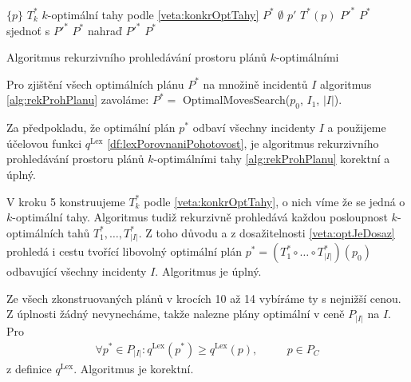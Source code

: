\begin{algorithm}[h]
  \begin{algorithmic}[1]
      \State \Return $\{ p \}$
    \EndIf
    \State $T^*_k$ \gets $k$-optimální tahy podle \ref{veta:konkrOptTahy}
    \State $P^*$ \gets $\emptyset$
      \State $p'$ \gets $T^*(p)$
      \State $P'^*$ \gets {}
        \State $P^*$ sjednoť s $P'^*$
        \State $P^*$ nahraď $P'^*$
      \EndIf
    \EndFor
    \State \Return $P^*$
  \EndFunction
  \end{algorithmic}
  \caption{Algoritmus rekurzivního prohledávání prostoru plánů $k$-optimálními}
  \label{alg:rekProhPlanu}
\end{algorithm}

Pro zjištění všech optimálních plánu $P^*$ na množině incidentů $I$ algoritmus \ref{alg:rekProhPlanu} zavoláme: $P^* = $ OptimalMovesSearch($p_0$, $I_1$, $|I|$).

\begin{veta}\label{veta:algoritmusPredpoklady}
  Za předpokladu, že optimální plán $p^*$ odbaví všechny incidenty $I$ a použijeme účelovou funkci $q^{\text{Lex}}$ \ref{df:lexPorovnaniPohotovost},
  je algoritmus rekurzivního prohledávání prostoru plánů $k$-optimálními tahy \ref{alg:rekProhPlanu} korektní a úplný.
\end{veta}
\begin{dukaz}
  V kroku 5 konstruujeme $T^*_k$ podle \ref{veta:konkrOptTahy}, o nich víme že se jedná o $k$-optimální tahy.
  Algoritmus tudiž rekurzivně prohledává každou posloupnost $k$-optimálních tahů $T^*_1, \dots, T^*_{|I|}$.
  Z toho důvodu a z dosažitelnosti \ref{veta:optJeDosaz} prohledá i cestu tvořící libovolný optimální plán $p^* = (T^*_1 \circ \dots \circ T^*_{|I|})(p_0)$ odbavující všechny incidenty $I$.
  Algoritmus je úplný.

  Ze všech zkonstruovaných plánů v krocích 10 až 14 vybíráme ty s nejnižší cenou.
  Z úplnosti žádný nevynecháme, takže nalezne plány optimální v ceně $P_{|I|}$ na $I$.
  Pro
  \begin{alignat*}
    \forall p^* \in P_{|I|} \colon q^{\text{Lex}}(p^*) \geq q^{\text{Lex}}(p), \quad && p \in P_C
  \end{alignat*}
  z definice $q^{\text{Lex}}$. Algoritmus je korektní.
\end{dukaz}

